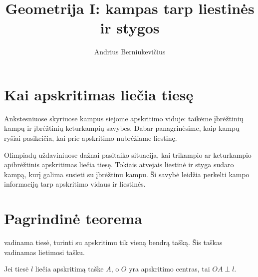\documentclass[11pt,a4paper]{scrartcl}
\title{Geometrija I: kampas tarp liestinės ir stygos}
\author{Andrius Berniukevičius}
\begin{document}
\maketitle

\section{Kai apskritimas liečia tiesę}
Ankstesniuose skyriuose kampus siejome apskritimo viduje: taikėme įbrėžtinių kampų ir įbrėžtinių keturkampių savybes. Dabar panagrinėsime, kaip kampų ryšiai pasikeičia, kai prie apskritimo nubrėžiame liestinę.

Olimpiadų uždaviniuose dažnai pasitaiko situacija, kai trikampio ar keturkampio apibrėžtinis apskritimas liečia tiesę. Tokiais atvejais liestinė ir styga sudaro kampą, kurį galima susieti su įbrėžtinu kampu. Ši savybė leidžia perkelti kampo informaciją tarp apskritimo vidaus ir liestinės.

\section{Pagrindinė teorema}

\begin{definition}
 vadinama tiesė, turinti su apskritimu tik vieną bendrą tašką. Šis taškas vadinamas lietimosi tašku.
\end{definition}

\begin{proposition}
Jei tiesė $l$ liečia apskritimą taške $A$, o $O$ yra apskritimo centras, tai $OA\perp l$.
\end{proposition}
\end{document}
